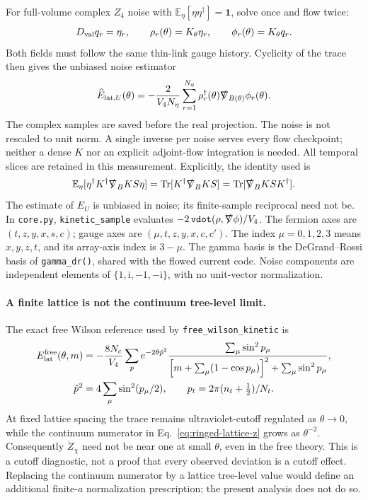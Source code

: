 \documentclass[11pt]{article}
\numberwithin{equation}{section}
\newcommand{\ii}{\mathrm{i}}
\DeclareMathOperator{\Tr}{Tr}
\begin{document}
For full-volume complex \(Z_4\) noise with
\(\mathbb E_\eta[\eta\eta^\dagger]=\mathbf1\), solve once and flow twice:
\begin{equation}
 D_{\rm val}q_r=\eta_r,\qquad
 \rho_r(\theta)=K_\theta\eta_r,\qquad
 \phi_r(\theta)=K_\theta q_r .
\end{equation}
Both fields must follow the same thin-link gauge history.  Cyclicity of the
trace then gives the unbiased noise estimator
\begin{equation}
 \widehat E_{{\rm lat},U}(\theta)
 =-\frac{2}{V_4N_\eta}\sum_{r=1}^{N_\eta}
       \rho_r^\dagger(\theta)
       \slashed\nabla_{B(\theta)}\phi_r(\theta).
 \label{eq:ringed-noise-estimator}
\end{equation}
The complex samples are saved before the real projection.  The noise is not
rescaled to unit norm.  A single inverse per noise serves every flow
checkpoint; neither a dense \(K\) nor an explicit adjoint-flow integration is
needed.  All temporal slices are retained in this measurement.
Explicitly, the identity used is
\begin{equation}
 \mathbb E_\eta[\eta^\dagger K^\dagger\slashed\nabla_BKS\eta]
 =\Tr[K^\dagger\slashed\nabla_BKS]
 =\Tr[\slashed\nabla_BKSK^\dagger].
\end{equation}
The estimate of \(E_U\) is unbiased in noise; its finite-sample reciprocal
need not be. In \texttt{core.py}, \texttt{kinetic\_sample} evaluates
\(-2\,\texttt{vdot}(\rho,\slashed\nabla\phi)/V_4\).
The fermion axes are \((t,z,y,x,s,c)\); gauge axes are
\((\mu,t,z,y,x,c,c')\). The index \(\mu=0,1,2,3\) means
\(x,y,z,t\), and its array-axis index is \(3-\mu\). The gamma basis is
the DeGrand--Rossi basis of \texttt{gamma\_dr()}, shared with the flowed
current code. Noise components are independent elements of
\(\{1,\ii,-1,-\ii\}\), with no unit-vector normalization.

\paragraph{A finite lattice is not the continuum tree-level limit.}
The exact free Wilson reference used by \texttt{free\_wilson\_kinetic} is
\begin{align}
 E_{\rm lat}^{\rm free}(\theta,m)
 &=-\frac{8N_c}{V_4}\sum_p e^{-2\theta\hat p^2}
 \frac{\sum_\mu\sin^2p_\mu}
 {\left[m+\sum_\mu(1-\cos p_\mu)\right]^2+\sum_\mu\sin^2p_\mu},
 \label{eq:ringed-free-lattice}\\
 \hat p^2&=4\sum_\mu\sin^2(p_\mu/2),\qquad
 p_t=2\pi(n_t+\tfrac12)/N_t.
\end{align}
At fixed lattice spacing the trace remains ultraviolet-cutoff regulated as
\(\theta\to0\), while the continuum numerator in
Eq.~\eqref{eq:ringed-lattice-z} grows as \(\theta^{-2}\).
Consequently \(\mathring Z_\chi\) need not be near one at small
\(\theta\), even in the free theory. This is a cutoff diagnostic, not a
proof that every observed deviation is a cutoff effect. Replacing the
continuum numerator by a lattice tree-level value would define an additional
finite-\(a\) normalization prescription; the present analysis does not do so.
\end{document}
